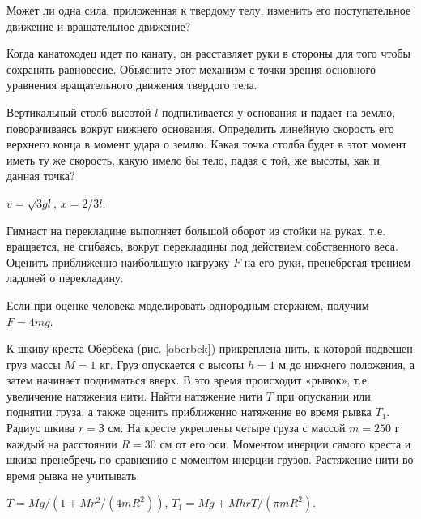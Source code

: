 \qualProblems

\begin{ex}
Может ли одна сила, приложенная к твердому телу, изменить его поступательное движение и вращательное движение?
\end{ex}	

\begin{ex}
Когда канатоходец идет по канату, он расставляет руки в стороны для того чтобы сохранять равновесие. Объясните этот механизм с точки зрения основного уравнения вращательного движения твердого тела.
\end{ex}	

\simpleProblems

\begin{ex} %
Вертикальный столб высотой $l$ подпиливается у основания и падает на землю, поворачиваясь вокруг нижнего основания. Определить линейную скорость его верхнего конца в момент удара о землю. Какая точка столба будет в этот момент иметь ту же скорость, какую имело бы тело, падая с той, же высоты, как и данная точка?
\begin{ans}
$v = \sqrt{3gl}$, $x = 2/3l$.
\end{ans}
\end{ex}	

\begin{ex} %
Гимнаст на перекладине выполняет большой оборот из стойки на руках, т.е. вращается, не сгибаясь, вокруг перекладины под действием собственного веса. Оценить приближенно наибольшую нагрузку $F$ на его руки, пренебрегая трением ладоней о перекладину.
\begin{ans}
Если при оценке человека моделировать однородным стержнем, получим $F = 4mg$.
\end{ans}
\end{ex}	

\begin{ex} %
К шкиву креста Обербека (рис. \ref{oberbek}) прикреплена нить, к которой подвешен груз массы $M = 1$ кг. Груз опускается с высоты $h = 1$ м до нижнего положения, а затем начинает подниматься вверх. В это время происходит «рывок», т.е. увеличение натяжения нити. Найти натяжение нити $T$ при опускании или поднятии груза, а также оценить приближенно натяжение во время рывка $T_1$. Радиус шкива $r = З$ см. На кресте укреплены четыре груза с массой $m = 250$ г каждый на расстоянии $R = 30$ см от его оси. Моментом инерции самого креста и шкива пренебречь по сравнению с моментом инерции грузов. Растяжение нити во время рывка не учитывать.
\begin{ans}
$T = Mg/(1 + Mr^2/(4mR^2))$, $T_1 = Mg + MhrT/(\pi m R^2)$.
\end{ans}
\end{ex}	

